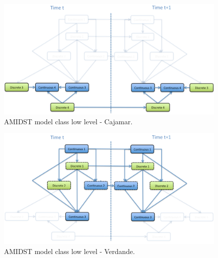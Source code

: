 \begin{figure}[ht!]
\begin{center}
\includegraphics[scale=0.39]{./figures/AMIDSTModelClassCajamar.png}
\caption{\label{Figure:AMIDSTModelClassCajamar} AMIDST model class low level - Cajamar.}
\end{center}
\end{figure}

\begin{figure}[ht!]
\begin{center}
\includegraphics[scale=0.39]{./figures/AMIDSTModelClassVerdande}
\caption{\label{Figure:AMIDSTModelClassVerdande} AMIDST model class low level - Verdande.}
\end{center}
\end{figure}


%
